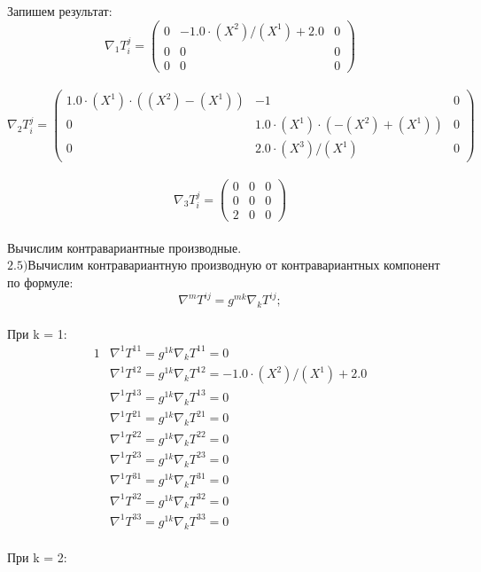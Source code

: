 \documentclass{article}
\begin{document}
Запишем результат:\\
\[
\nabla_1T^j_i = \begin{pmatrix}
	0 & -1.0\cdot (X^2)/(X^1) + 2.0 & 0\\
	0 & 0 & 0\\
	0 & 0 & 0
\end{pmatrix}
\]\\
\[
\nabla_2T^j_i = \begin{pmatrix}
	1.0\cdot (X^1)\cdot ((X^2) - (X^1)) & -1 & 0\\
	0 & 1.0\cdot (X^1)\cdot (-(X^2) + (X^1)) & 0\\
	0 & 2.0\cdot (X^3)/(X^1) & 0
\end{pmatrix}
\]\\
\[
\nabla_3T^j_i = \begin{pmatrix}
	0 & 0 & 0\\
	0 & 0 & 0\\
	2 & 0 & 0
\end{pmatrix}
\]\\
Вычислим контравариантные производные.\\
$\mathrm{2.5) }$Вычислим контравариантную производную от контравариантных компонент по формуле:\\
\[
\nabla^mT^{ij} = g^{mk}\nabla_kT^{ij};
\]\\
При k = 1:\\
\begin{alignat*}{1}
  & \nabla^1T^{11} = g^{1k}\nabla_kT^{11} = 0 \\
  & \nabla^1T^{12} = g^{1k}\nabla_kT^{12} = -1.0\cdot (X^2)/(X^1) + 2.0 \\
  & \nabla^1T^{13} = g^{1k}\nabla_kT^{13} = 0 \\
  & \nabla^1T^{21} = g^{1k}\nabla_kT^{21} = 0 \\
  & \nabla^1T^{22} = g^{1k}\nabla_kT^{22} = 0 \\
  & \nabla^1T^{23} = g^{1k}\nabla_kT^{23} = 0 \\
  & \nabla^1T^{31} = g^{1k}\nabla_kT^{31} = 0 \\
  & \nabla^1T^{32} = g^{1k}\nabla_kT^{32} = 0 \\
  & \nabla^1T^{33} = g^{1k}\nabla_kT^{33} = 0 
\end{alignat*}\\
При k = 2:\\
\end{document}
